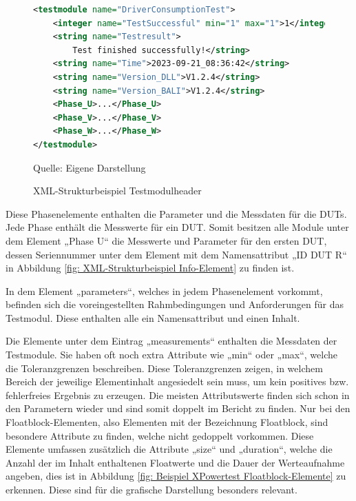\begin{figure}[H]
\centering
\begin{minipage}{0.95\textwidth}
\begin{lstlisting}[language=XML]
<testmodule name="DriverConsumptionTest">
    <integer name="TestSuccessful" min="1" max="1">1</integer>
    <string name="Testresult">
        Test finished successfully!</string>
    <string name="Time">2023-09-21_08:36:42</string>
    <string name="Version_DLL">V1.2.4</string>
    <string name="Version_BALI">V1.2.4</string>
    <Phase_U>...</Phase_U>
    <Phase_V>...</Phase_V>
    <Phase_W>...</Phase_W>
</testmodule>
\end{lstlisting}
\end{minipage}
\caption{XML-Strukturbeispiel Testmodulheader}
\label{fig: XML-Strukturbeispiel Testmodulheader}
    {Quelle: Eigene Darstellung}
\end{figure}

Diese Phasenelemente enthalten die Parameter und die Messdaten für die DUTs. Jede Phase enthält die Messwerte für ein DUT.
Somit besitzen alle Module unter dem Element „Phase U“ die Messwerte und Parameter für den ersten DUT, dessen Seriennummer
unter dem Element mit dem Namensattribut „ID DUT R“ in Abbildung \ref{fig: XML-Strukturbeispiel Info-Element} zu finden ist.

In dem Element „parameters“, welches in jedem Phasenelement vorkommt, befinden sich die voreingestellten Rahmbedingungen
und Anforderungen für das Testmodul. Diese enthalten alle ein Namensattribut und einen Inhalt.

Die Elemente unter dem Eintrag „measurements“ enthalten die Messdaten der Testmodule. Sie haben oft noch extra Attribute
wie „min“ oder „max“, welche die Toleranzgrenzen beschreiben. Diese Toleranzgrenzen zeigen, in welchem Bereich der jeweilige
Elementinhalt angesiedelt sein muss, um kein positives bzw. fehlerfreies Ergebnis zu erzeugen.
Die meisten Attributswerte finden sich schon in den Parametern wieder und sind somit doppelt im Bericht zu finden.
Nur bei den Floatblock-Elementen, also Elementen mit der Bezeichnung Floatblock, sind besondere Attribute zu finden,
welche nicht gedoppelt vorkommen.
Diese Elemente umfassen zusätzlich die Attribute „size“ und „duration“, welche die Anzahl der im Inhalt enthaltenen
Floatwerte und die Dauer der Werteaufnahme angeben, dies ist in Abbildung \ref{fig: Beispiel XPowertest Floatblock-Elemente} zu erkennen.
Diese sind für die grafische Darstellung besonders relevant.

